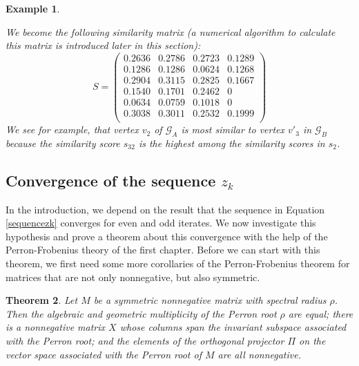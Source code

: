 \documentclass[a4paper,11pt]{report}
\newtheorem{theorem}{Theorem}[section]
\newtheorem{example}[theorem]{Example}
\newcommand{\graf}{\mathscr{G}}
\begin{document}
\begin{example}
\begin{center}
\end{center}
We become the following similarity matrix (a numerical algorithm to calculate this matrix is introduced later
in this section):
$$S = \begin{pmatrix}
0.2636 & 0.2786 & 0.2723 & 0.1289 \\
0.1286 & 0.1286 & 0.0624 & 0.1268 \\
0.2904 & 0.3115 & 0.2825 & 0.1667 \\
0.1540 & 0.1701 & 0.2462 & 0 \\
0.0634 & 0.0759 & 0.1018 & 0 \\
0.3038 & 0.3011 & 0.2532 & 0.1999\\
 \end{pmatrix}$$
 We see for example, that vertex $v_2$ of $\graf_A$ is most similar to
 vertex $v'_3$ in $\graf_B$  because the similarity score $s_{32}$ 
 is the highest among the similarity scores in $s_{2}$.
 \end{example}
 
 \subsection{Convergence of the sequence $z_k$}
In the introduction, we depend on the result that the sequence in Equation \ref{sequencezk} 
converges for even and odd iterates. We now investigate this hypothesis and 
prove a theorem about this convergence with the help of the Perron-Frobenius theory of the 
first chapter. Before we can start with this theorem, we first need some more 
corollaries of the Perron-Frobenius theorem for matrices that are not only nonnegative, but also symmetric.

\begin{theorem}
  Let $M$ be a symmetric nonnegative matrix with spectral radius $\rho$. Then 
  the algebraic and geometric multiplicity of the Perron root $\rho$ are equal; 
  there is a nonnegative matrix $X$ whose columns span the invariant subspace 
  associated with the Perron root; and the elements of the orthogonal projector 
  $\Pi$ on the vector space associated with the Perron root of $M$ are all 
  nonnegative.
\end{theorem}
\end{document}
